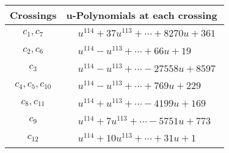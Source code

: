 \documentclass[1p]{elsarticle_modified}
\theoremstyle{definition}
\begin{document}
\begin{tabular}{m{50pt}|m{274pt}}
Crossings & \hspace{64pt}u-Polynomials at each crossing \\
\hline $$\begin{aligned}c_{1},c_{7}\end{aligned}$$&$\begin{aligned}
&u^{114}+37 u^{113}+\cdots+8270 u+361
\end{aligned}$\\
\hline $$\begin{aligned}c_{2},c_{6}\end{aligned}$$&$\begin{aligned}
&u^{114}- u^{113}+\cdots+66 u+19
\end{aligned}$\\
\hline $$\begin{aligned}c_{3}\end{aligned}$$&$\begin{aligned}
&u^{114}- u^{113}+\cdots-27558 u+8597
\end{aligned}$\\
\hline $$\begin{aligned}c_{4},c_{5},c_{10}\end{aligned}$$&$\begin{aligned}
&u^{114}- u^{113}+\cdots+769 u+229
\end{aligned}$\\
\hline $$\begin{aligned}c_{8},c_{11}\end{aligned}$$&$\begin{aligned}
&u^{114}+u^{113}+\cdots-4199 u+169
\end{aligned}$\\
\hline $$\begin{aligned}c_{9}\end{aligned}$$&$\begin{aligned}
&u^{114}+7 u^{113}+\cdots-5751 u+773
\end{aligned}$\\
\hline $$\begin{aligned}c_{12}\end{aligned}$$&$\begin{aligned}
&u^{114}+10 u^{113}+\cdots+31 u+1
\end{aligned}$\\
\hline
\end{tabular}\\~\\
\newpage\renewcommand{\arraystretch}{1}
\end{document}
